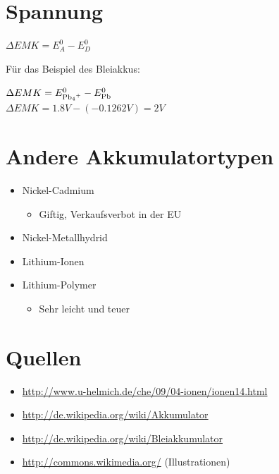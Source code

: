 \documentclass[11pt]{article}
\begin{document}
\section{Spannung}
  $\Delta EMK = E ^{0} _{A} - E ^{0} _{D}$

Für das Beispiel des Bleiakkus:

  $\Delta EMK = E ^{0} _{\ce{Pb4+}} - E ^{0} _{\ce{Pb}}$ \\
  $\Delta EMK = 1.8V - (-0.1262V) = 2V$

\section{Andere Akkumulatortypen}
\begin{itemize}
\item Nickel-Cadmium
  \begin{itemize}
  \item Giftig, Verkaufsverbot in der EU
  \end{itemize}
\item Nickel-Metallhydrid
\item Lithium-Ionen
\item Lithium-Polymer
  \begin{itemize}
  \item Sehr leicht und teuer
  \end{itemize}
\end{itemize}

\section{Quellen}
\begin{itemize}
\item \url{http://www.u-helmich.de/che/09/04-ionen/ionen14.html}
\item \url{http://de.wikipedia.org/wiki/Akkumulator}
\item \url{http://de.wikipedia.org/wiki/Bleiakkumulator}
\item \url{http://commons.wikimedia.org/} (Illustrationen)
\end{itemize}
\end{document}
